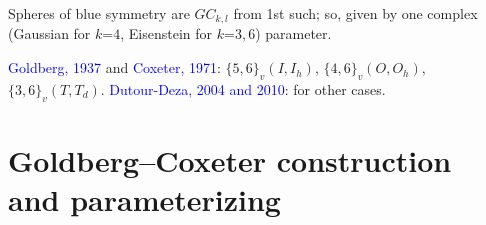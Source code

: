 \documentclass{beamer}
\begin{document}
\begin{frame}
\pause

Spheres of blue symmetry  are  $GC_{k,l}$ from 1st such; so, given
 by one complex (Gaussian for $k$=$4$, Eisenstein for $k$=$3,6$) 
parameter.


\textcolor{blue}{Goldberg, 1937} and \textcolor{blue}{Coxeter, 1971}: 
$\{5,6\}_v(I,I_h)$, $\{4,6\}_v(O,O_h)$,  
$\{3,6\}_v(T,T_d)$. 
\textcolor{blue}{Dutour-Deza, 2004 and  2010}: for other cases.
\end{frame}

\section[]{Goldberg--Coxeter construction
and parameterizing}

\end{document}
